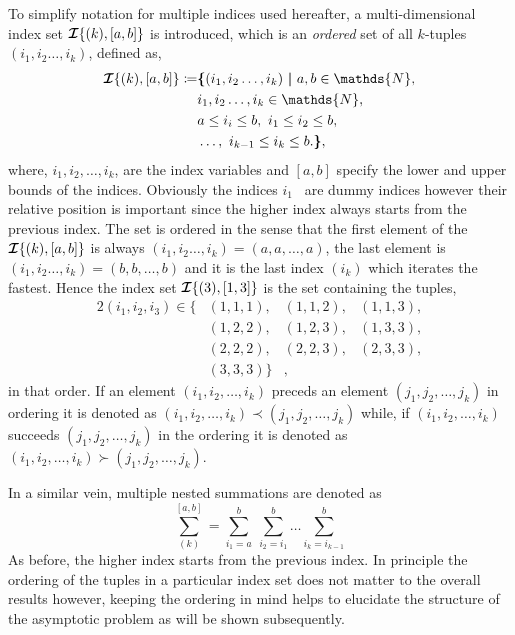 To simplify notation for multiple indices used hereafter, a multi-dimensional index set $\bm{\mathcal{I}}\{(k),[a,b]\}$ is introduced, which is an \emph{ordered} set of all  $k$-tuples $(i_{1},i_{2}\ldots,i_{k})$, defined as, 
\begin{equation}
	\label{eqn:index_set}
	\begin{split}
		\IndexSet{k}{a,b} \coloneq &  \bm{\lbrace} (i_{1},i_{2}\ldots,i_{k})\ \bm{|}\ a,b \in \mathds{N}, \\
		& i_{1},i_{2}\ldots,i_{k} \in\mathds{N}, \\
		& a\le i_{i} \le b,\ i_{1}\le i_{2} \le b, \\
		& \ldots, \  i_{k-1}\le i_{k} \le b. \bm{\rbrace},
	\end{split}
\end{equation}
where, $i_{1},i_{2},\ldots,i_{k}$, are the index variables and $[a,b]$ specify the lower and upper bounds of the indices. Obviously the indices $i_{1}$ \etc\ are dummy indices however their relative position is important since the higher index always starts from the previous index. The set is ordered in the sense that the first element of the $\bm{\mathcal{I}}\{(k),[a,b]\}$ is always $(i_{1},i_{2}\ldots,i_{k}) = (a,a,\ldots,a)$, the last element is $(i_{1},i_{2}\ldots,i_{k}) = (b,b,\ldots,b)$ and it is the last index $(i_{k})$ which iterates the fastest. Hence the index set $\bm{\mathcal{I}}\{(3),[1,3]\}$ is the set containing the tuples, 
\begin{alignat}{2}
	(i_{1},i_{2},i_{3}) \in\{ & (1,1,1), & (1,1,2), & (1,1,3), \nonumber \\
								  	  & (1,2,2), & (1,2,3),& (1,3,3),  \nonumber \\
								 	  & (2,2,2), & (2,2,3), & (2,3,3), \nonumber \\
								 	  & (3,3,3) \} &,   &   \nonumber 
\end{alignat}
in that order. If an element $(i_{1},i_{2},\ldots,i_{k})$ preceds an element $(j_{1},j_{2},\ldots,j_{k})$ in ordering it is denoted as $(i_{1},i_{2},\ldots,i_{k}) \prec (j_{1},j_{2},\ldots,j_{k})$ while, if  $(i_{1},i_{2},\ldots,i_{k})$ succeeds $(j_{1},j_{2},\ldots,j_{k})$ in the ordering it is denoted as $(i_{1},i_{2},\ldots,i_{k}) \succ (j_{1},j_{2},\ldots,j_{k})$. 

In a similar vein, multiple nested summations are denoted as 
\begin{equation}
	\label{eqn:summation}
	\sum_{(k)}^{[a,b]} = \sum_{i_{1}=a}^{b}\ \sum_{i_{2}=i_{1}}^{b}\ldots\sum_{i_{k}=i_{k-1}}^{b}
\end{equation}
As before, the higher index starts from the previous index. In principle the ordering of the tuples in a particular index set does not matter to the overall results however, keeping the ordering in mind helps to elucidate the structure of the asymptotic problem as will be shown subsequently. 

